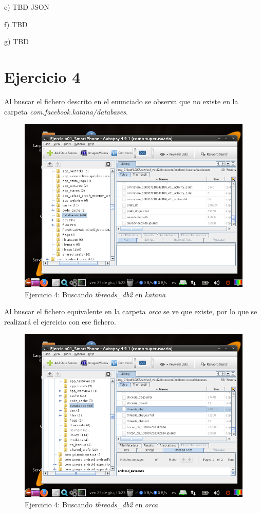 \documentclass[11pt]{article}
\begin{document}
e) TBD JSON

f) TBD

g) TBD

\section{Ejercicio 4}
Al buscar el fichero descrito en el enunciado se observa que no existe en la carpeta \textit{com.facebook.katana/databases}.

\begin{figure}[H]
    \caption{Ejercicio 4: Buscando \textit{threads\_db2} en \textit{katana}}
    \centering
    \includegraphics[scale=0.7]{e4-1.png}
\end{figure}

Al buscar el fichero equivalente en la carpeta \textit{orca} se ve que existe, por lo que se realizará el ejercicio con ese fichero.

\begin{figure}[H]
    \caption{Ejercicio 4: Buscando \textit{threads\_db2} en \textit{orca}}
    \centering
    \includegraphics[scale=0.7]{e4-2.png}
\end{figure}
\end{document}
